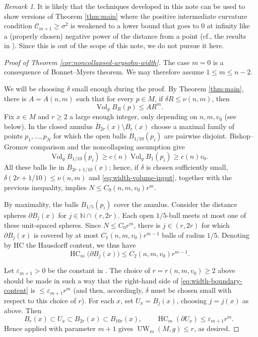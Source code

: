 \documentclass[11pt]{amsart}
\theoremstyle{definition}
\theoremstyle{remark}
\newtheorem{remark}[theorem]{Remark}
\DeclareMathOperator{\Vol}{Vol}
\begin{document}
\begin{remark}
    It is likely that the techniques developed in this note can be used to show versions of Theorem \ref{thm:main} where the positive intermediate curvature condition $\mathcal{C}_{m+1}\geq \sigma^2$ is weakened to a lower bound that goes to $0$ at infinity like a (properly chosen) negative power of the distance from a point (cf., the results in \cite{MunteanuWang, ChodoshLiStryker}). Since this is out of the scope of this note, we do not pursue it here.
\end{remark}

\begin{proof}[Proof of Theorem \ref{cor:noncollapsed-urysohn-width}]
The case $m=0$ is a consequence of Bonnet--Myers theorem. We may
therefore assume $1\leq m\leq n-2$.

We will be choosing $\delta$ small enough during the proof. By Theorem \ref{thm:main}, there is $A=A(n,m)$ such that for every $p\in M$, if $\delta R\leq \nu(n,m)$, then
\begin{equation}\label{eq:width-volume-input}
                 \Vol_g B_R(p)\leq A R^m.
\end{equation}
Fix $x\in M$ and $r\geq2$ a large enough integer, only depending on $n,m,v_0$ (see below).  In the
closed annulus $\overline B_{2r}(x)\setminus B_r(x)$ choose a maximal
family of points $p_1,\ldots,p_N$ for which the open balls
$B_{1/10}(p_i)$ are pairwise disjoint.  Bishop--Gromov comparison and
the noncollapsing assumption give
\[
 \Vol_g B_{1/10}(p_i)
 \geq c(n)\Vol_g B_1(p_i)
 \geq c(n)v_0.
\]
All these balls lie in $B_{2r+1/10}(x)$; hence, if $\delta$ is chosen sufficiently small, $\delta(2r+1/10)\leq \nu(n,m)$ and
\eqref{eq:width-volume-input}, together with the previous inequality, implies $
                         N\leq C_0(n,m,v_0)r^m$. 

By maximality, the balls $B_{1/5}(p_i)$ cover the annulus.  Consider
the distance spheres $\partial B_j(x)$ for $ j\in \mathbb N\cap(r,2r)$.
Each open $1/5$-ball meets at most one of these unit-spaced spheres.
Since $N\leq C_0 r^m$, there is $j\in(r,2r)$ for which $\partial B_j(x)$ is
covered by at most $C_1(n,m,v_0)r^{m-1}$ balls of radius $1/5$.  Denoting by $\mathrm{HC}$ the Hausdorff content, we thus have
\begin{equation}\label{eq:width-boundary-content}
       \operatorname{HC}_m\bigl(\partial B_j(x)\bigr)
       \leq C_2(n,m,v_0)r^{m-1}.
\end{equation}

Let $\varepsilon_{m+1}>0$ be the constant in
\cite[Theorem~3.3]{Papasoglu}. The choice of $r=r(n,m,v_0)\geq2$ above should be made in such a way
that the right-hand side of \eqref{eq:width-boundary-content} is $\leq \varepsilon_{m+1}r^m$ (and then, accordingly, $\delta$ must be chosen small with respect to this choice of $r$).  For each $x$, set $U_x=B_j(x)$, choosing
$j=j(x)$ as above.  Then
\[
 B_r(x)\subset U_x\subset B_{2r}(x)\subset B_{10r}(x),
 \qquad
 \operatorname{HC}_m(\partial U_x)\leq
 \varepsilon_{m+1}r^m.
\]
Hence \cite[Theorem 3.3]{Papasoglu} applied with parameter $m+1$ gives
$\operatorname{UW}_m(M,g)\leq r$, as desired.
\end{proof}
\end{document}

